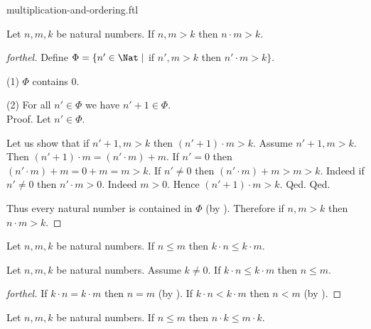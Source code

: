 \documentclass{naproche-library}
\begin{document}
\begin{smodule}{multiplication-and-ordering.ftl}
  \begin{proposition}[forthel,id=ARITHMETIC_06_1826268599287808,printid]
    Let $n, m, k$ be natural numbers.
    If $n, m > k$ then $n \cdot m > k$.
  \end{proposition}
  \begin{proof}[forthel]
    Define $\Phi = \{ n' \in \Nat \mid$ if $n', m > k$ then $n' \cdot m > k \}$.

    (1) $\Phi$ contains $0$.

    (2) For all $n' \in \Phi$ we have $n' + 1 \in \Phi$. \\
    Proof.
      Let $n' \in \Phi$.

      Let us show that if $n' + 1, m > k$ then $(n' + 1) \cdot m > k$.
        Assume $n' + 1, m > k$.
        Then $(n' + 1) \cdot m = (n' \cdot m) + m$.
        If $n' = 0$ then
        $(n' \cdot m) + m
          = 0 + m
          = m
          > k$.
        If $n' \neq 0$ then
        $(n' \cdot m) + m
          > m
          > k$.
        Indeed if $n' \neq 0$ then $n' \cdot m > 0$.
        Indeed $m > 0$.
        Hence $(n' + 1) \cdot m > k$.
      Qed.
    Qed.

    Thus every natural number is contained in $\Phi$ (by ).
    Therefore if $n, m > k$ then $n \cdot m > k$.
  \end{proof}

  \begin{corollary}[forthel,id=ARITHMETIC_06_1751605544222720,printid]
    Let $n, m, k$ be natural numbers.
    If $n \leq m$ then $k \cdot n \leq k \cdot m$.
  \end{corollary}

  \begin{corollary}[forthel,id=ARITHMETIC_06_3965209318260736,printid]
    Let $n, m, k$ be natural numbers.
    Assume $k \neq 0$.
    If $k \cdot n \leq k \cdot m$ then $n \leq m$.
  \end{corollary}
  \begin{proof}[forthel]
    If $k \cdot n = k \cdot m$ then $n = m$ (by ).
    If $k \cdot n < k \cdot m$ then $n < m$ (by ).
  \end{proof}

  \begin{corollary}[forthel,id=ARITHMETIC_06_8946886668976128,printid]
    Let $n, m, k$ be natural numbers.
    If $n \leq m$ then $n \cdot k \leq m \cdot k$.
  \end{corollary}


\end{smodule}
\end{document}
